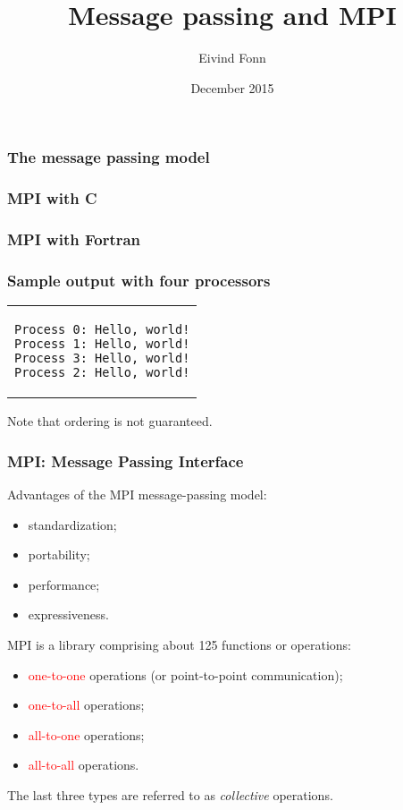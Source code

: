 

\title{Message passing and MPI}
\author{Eivind Fonn}
\date{December 2015}
\maketitle

\begin{frame}
  \frametitle{The message passing model}
  \begin{center}
    
  \end{center}
\end{frame}

\begin{frame}[fragile]
  \frametitle{MPI with C}
  \scalebox{0.5}{
    
  }
\end{frame}

\begin{frame}[fragile]
  \frametitle{MPI with Fortran}
  \scalebox{0.5}{
    
  }
\end{frame}

\begin{frame}[fragile]
  \frametitle{Sample output with four processors}
  \begin{center}
    \begin{tabular}{c}
\begin{lstlisting}
Process 0: Hello, world!
Process 1: Hello, world!
Process 3: Hello, world!
Process 2: Hello, world!
\end{lstlisting}
    \end{tabular}
  \end{center}
  Note that ordering is not guaranteed.
\end{frame}

\begin{frame}
  \frametitle{MPI: Message Passing Interface}
  Advantages of the MPI message-passing model:
  \begin{itemize}
  \item standardization;
  \item portability;
  \item performance;
  \item expressiveness.
  \end{itemize}

  MPI is a library comprising about 125 functions or operations:
  \begin{itemize}
  \item \textcolor{red}{one-to-one} operations (or point-to-point communication);
  \item \textcolor{red}{one-to-all} operations;
  \item \textcolor{red}{all-to-one} operations;
  \item \textcolor{red}{all-to-all} operations.
  \end{itemize}
  The last three types are referred to as {\em collective} operations.
\end{frame}


